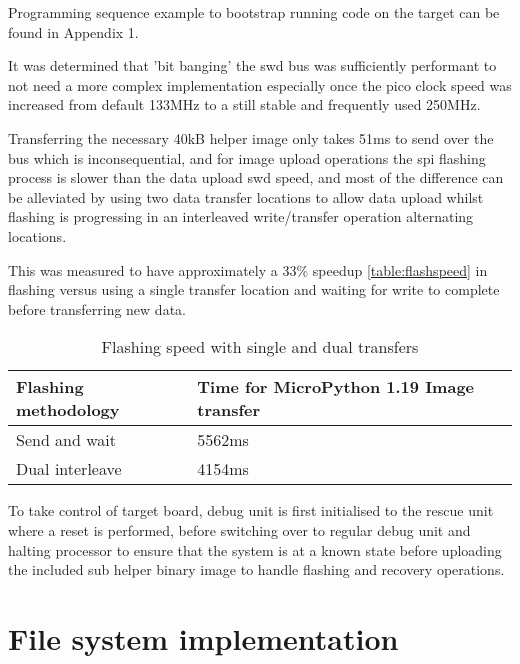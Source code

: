 Programming sequence example to bootstrap running code on the target can be found in Appendix 1.

It was determined that 'bit banging' the \gls{swd} bus was sufficiently performant to not need a more complex implementation especially once the pico clock speed was increased from default 133MHz to a still stable and frequently used 250MHz.

Transferring the necessary 40kB helper image only takes 51ms to send over the bus which is inconsequential, and for  image upload operations the \gls{spi} flashing process is slower than the data upload  \gls{swd} speed, and most of the difference can be alleviated by using two data transfer locations to allow data upload whilst flashing is progressing in an interleaved write/transfer operation alternating locations.

This was measured to have approximately a 33\% speedup \autoref{table:flashspeed} in flashing versus using a single transfer location and waiting for write to complete before transferring new data.

\begin{table}[h]
	\centering
	\caption{Flashing speed with single and dual transfers}%
	\vspace{-16.5pt}%
	
	\begin{tabular}{|l|l|}
		\hline
		Flashing methodology & Time for MicroPython 1.19 Image transfer  \\ \hline
		Send and wait & 5562ms \\ \hline
		Dual interleave & 4154ms \\ \hline
	\end{tabular}
	\label{table:flashspeed}
\end{table}

To take control of target board, debug unit is first initialised to the rescue unit where a reset is performed, before switching over to regular debug unit and halting processor to ensure that the system is at a known state before uploading the  included sub helper binary image to handle flashing and recovery operations.

\clearpage
\section{File system implementation}

